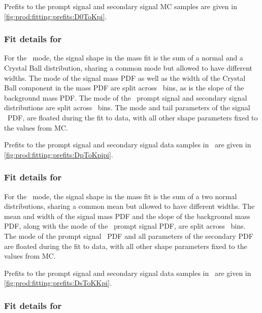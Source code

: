 Prefits to the prompt signal and secondary signal \ac{MC} samples are given in 
\cref{fig:prod:fitting:prefits:D0ToKpi}.

\subsubsection*{Fit details for \PDplus}
\label{chap:prod:fitting:details:DpToKpipi}

For the \DpToKpipi\ mode, the signal shape in the mass fit is the sum of a 
normal and a Crystal Ball distribution, sharing a common mode but allowed to 
have different widths.
The mode of the signal mass \ac{PDF} as well as the width of the Crystal Ball 
component in the mass \ac{PDF} are split across \pTy\ bins, as is the slope of 
the background mass \ac{PDF}.
The mode of the \lnipchisq\ prompt signal and secondary signal distributions 
are split across \pTy\ bins.
The mode and tail parameters of the signal \lnipchisq\ \ac{PDF}, are floated 
during the fit to data, with all other shape parameters fixed to the values 
from \ac{MC}.

Prefits to the prompt signal and secondary signal data samples in \lnipchisq\ 
are given in \cref{fig:prod:fitting:prefits:DpToKpipi}.

\subsubsection*{Fit details for \PDsplus}
\label{chap:prod:fitting:details:DsToKKpi}

For the \DspTophipi\ mode, the signal shape in the mass fit is the sum of a two 
normal distributions, sharing a common mean but allowed to have different 
widths.
The mean and width of the signal mass \ac{PDF} and the slope of the background 
mass \ac{PDF}, along with the mode of the \lnipchisq\ prompt signal \ac{PDF}, 
are split across \pTy\ bins.
The mode of the prompt signal \lnipchisq\ \ac{PDF} and all parameters of the 
secondary \ac{PDF} are floated during the fit to data, with all other shape 
parameters fixed to the values from \ac{MC}.

Prefits to the prompt signal and secondary signal data samples in \lnipchisq\ 
are given in \cref{fig:prod:fitting:prefits:DsToKKpi}.

\subsubsection*{Fit details for \PDstarp}
\label{chap:prod:fitting:details:DstToD0pi}

